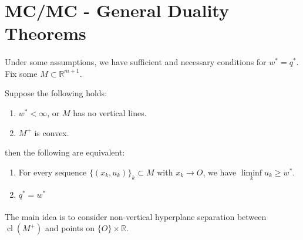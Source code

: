 \section{MC/MC - General Duality Theorems}
\label{sect:032}

\paragraph{}Under some assumptions, we have sufficient and necessary conditions for $w^\ast=q^\ast$. Fix some $M\subset \mathbb{R}^{m+1}$.

\begin{prop}\label{prop:032-strong-duality}
	Suppose the following holds:
	\begin{enumerate}[label=(\alph*)]
		\item $w^\ast<\infty$, or $M$ has no vertical lines.
		\item $M^+$ is convex.
	\end{enumerate}
	then the following are equivalent:
	\begin{enumerate}[label=(\arabic*)]
		\item For every sequence $\{(x_k,u_k)\}_{k}\subset M$ with $x_k\to O$, we have $\underset{k}{\operatorname{liminf}}u_k\geq w^\ast$.
		\item $q^\ast=w^\ast$
	\end{enumerate}
\end{prop}

\paragraph{}The main idea is to consider non-vertical hyperplane separation between $\operatorname{cl}(M^+)$ and points on $\{O\}\times \mathbb{R}$.

